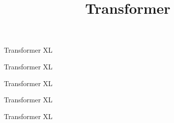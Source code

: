 



\newcommand\warning{%
 \makebox[1.4em][c]{%
 \makebox[0pt][c]{\raisebox{.1em}{\scriptsize!}}%
 \makebox[0pt][c]{\color{red}\normalsize$\bigtriangleup$}}}%

\newcommand{\titlefigure}{figure/transformer.png}
\newcommand{\learninggoals}{
\item Understand BPE
\item Understand the Transformer Encoder + Decoder
\item Understand how they are connected
\item Understand the limitations for long sequences}

\title{Transformer}
\date{}




\begin{vbframe}{Transformer XL}

\end{vbframe}


\begin{vbframe}{Transformer XL}

\end{vbframe}


\begin{vbframe}{Transformer XL}

\end{vbframe}


\begin{vbframe}{Transformer XL}

\end{vbframe}


\begin{vbframe}{Transformer XL}

\end{vbframe}


\endlecture

